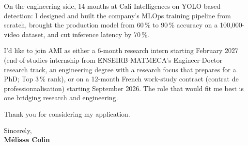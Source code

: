\documentclass[10pt, letterpaper]{article}
\begin{document}
On the engineering side, 14 months at Cali Intelligences on YOLO-based detection: I designed and built the company's MLOps training pipeline from scratch, brought the production model from 60\,\% to 90\,\% accuracy on a 100,000-video dataset, and cut inference latency by 70\,\%.

I'd like to join AMI as either a 6-month research intern starting February 2027 (end-of-studies internship from ENSEIRB-MATMECA's Engineer-Doctor research track, an engineering degree with a research focus that prepares for a PhD; Top 3\,\% rank), or on a 12-month French work-study contract (contrat de professionnalisation) starting September 2026. The role that would fit me best is one bridging research and engineering.

Thank you for considering my application.

\vspace{6pt}
Sincerely, \\
\textbf{Mélissa Colin}
\end{document}
